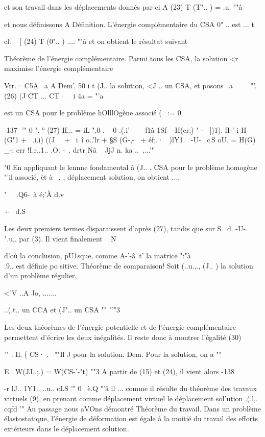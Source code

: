 {{{{{{{{et son travail dans les déplacements donnés par 
ci A
(23) T (T".. ) = 
.u. ""â 

et nous définissons 
A 
Définition. L'énergie complémentaire du CSA 0" .. est 
... t 

cl. ~ 
[ (24) 
T (0".. ) 
.... ""â 
et on obtient le résultat suivant 

Théorème de l'énergie complémentaire. Parmi tous les CSA, la solution <r~~ 
maximise l'énergie complémentaire 

Vrr.· C5A 
~a 
A 
Dem'. 50 i t (J.. la solution, <J .. un CSA, et posons 
~a ~~ 
~ 
"'.
(26) (J CT ... CT·  
~i 
4a
= "'a 

est un CSA pour le problème hOlllOgène associé ( ~:= 0 

-137 ­
'" 0 ".
° 
(27) If... =-iL ",0 , ~ 0 
.(.i'~ ~~ f1\.à 1Sf ~ 
H(cr;) " -~ ])1). fI-'-i H (G"1 + ~.i.i) ((J~~ + ~i~î o..'lr 
+ §S (G-,-~ + éf;.·~ )lY1.~ -U-~ c\,S 
oU. 
= H(G) _-: crr !I.r,.1.. .O. -~. drtr
Nâ ~ JjJ n. ka ..~,...'" 

"0
En appliquant le lennne fondamental à (J.. , CSA pour le problème homogène
"'il associé, èt à ~. , déplacement solution, on obtient 
.... 

" ~~.Q6-~à é;'À d.v 

+ ~d.S 

Les deux premiers termes disparaissent d'après (27), tandis que sur S~ 
d.
-U-. ".u,. par (3). Il vient finalement 
~ N 

d'où la conclusion, pU1sque, comme A-'-â~t' la matrice ":"à\\.9,. est définie po­
sitive. 
Théorème de comparaison! Soit (..u.,., (J.. ) la solution d'un problème régulier, 

<'V ..A Jo, ....... ~ 

..(.t.. un CCA et (J".. un CSA 
"" "'"3 

Les deux théorèmes de l'énergie potentielle et de l'énergie com­plémentaire permettent d'écrire les deux inégalités. Il reste donc à montrer 
l'égalité 
(30) 

'" . Il. ( CS· . \ 
""Il J 
pour la solution. 
Dem. Pour la solution, on a 
"" 

E..
W(JJ..;.) = W(CS-'-"t) 
""3 
A partir de (15) et (24), il vient alors 
-138 ­


-r lJ.. 1Y1.. ..u.. cLS 
'" 0
~è.Q "'â il ... 
comme il résulte du théorème des travaux virtuels (9), en prenant comme dé­placement virtuel le déplacement sol'ution .(.l,. cqfd
'" 
Au passage nous aVOns démontré 
Théorème du travail. Dans un problème élastostatique, l'énergie de déforma­tion est égale à la moitié du travail des efforts extérieurs dans le dépla­cement solution. 

}}}}}}}}
